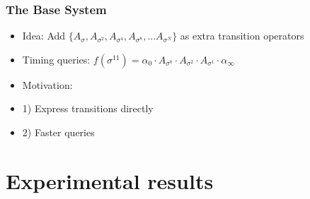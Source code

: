 \documentclass{beamer}
\begin{document}
\begin{frame}
\frametitle{The Base System}
\begin{itemize}

\item Idea: Add $\{A_{\sigma}, A_{\sigma^2}, A_{\sigma^4}, A_{\sigma^8}, ... A_{\sigma^N}\}$ as extra transition operators

\item Timing queries: $f(\sigma^{11}) = \alpha_0 \cdot A_{\sigma^8} \cdot A_{\sigma^2} \cdot A_{\sigma^1} \cdot \alpha_\infty$

\item Motivation: 
\item[] 1) Express transitions directly
\item[] 2) Faster queries
\end{itemize}
\end{frame}

\section{Experimental results}
\end{document}
